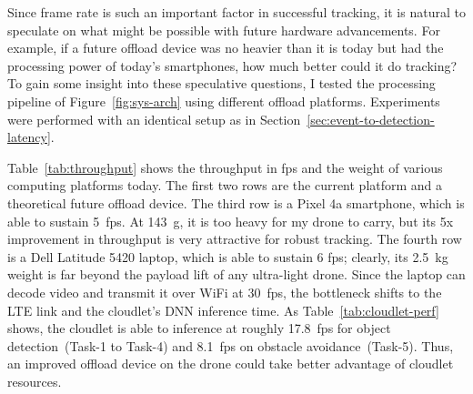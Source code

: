 Since frame rate is such an important factor in successful tracking,
it is natural to speculate on what might be possible with future
hardware advancements.  For example, if a future offload device was no heavier
than it is today but had the processing power of today's smartphones,
how much better could it do tracking?  To gain some insight into these
speculative questions, I tested the processing pipeline of
Figure~\ref{fig:sys-arch} using different offload platforms.  Experiments were performed with an identical setup as in Section~\ref{sec:event-to-detection-latency}.

Table~\ref{tab:throughput} shows the throughput in fps and the weight
of various computing platforms today. The first two rows are the
current platform and a theoretical future offload device.  The third row is a Pixel 4a smartphone, which is able to sustain 5~fps. At 143~g, it is too heavy
for my drone to carry, but its 5x improvement in throughput is very
attractive for robust tracking. The fourth row is a Dell Latitude 5420
laptop, which is able to sustain 6 fps; clearly, its 2.5~kg weight is
far beyond the payload lift of any ultra-light drone.  Since the
laptop can decode video and transmit it over WiFi at 30~fps, the
bottleneck shifts to the LTE link and the cloudlet's DNN inference
time.  As Table~\ref{tab:cloudlet-perf} shows, the cloudlet is able
to inference at roughly 17.8~fps for object detection~(Task-1 to
Task-4) and 8.1~fps on obstacle avoidance~(Task-5). Thus, an improved offload device on the drone could take better advantage of cloudlet resources.




